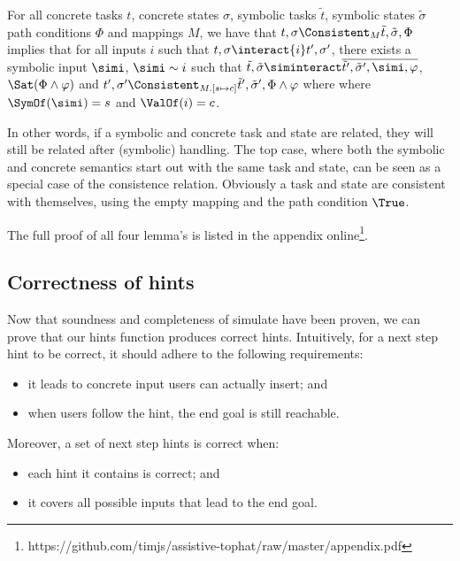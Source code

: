 \begin{lemma}
  \label{lem:completeinteracting}
  For all concrete tasks $t$, concrete states $\sigma$, symbolic tasks $\tilde{t}$, symbolic states $\tilde{\sigma}$ path conditions $\Phi$ and mappings $M$,
  we have that $t,\sigma\Consistent_{M}\tilde{t},\tilde{\sigma},\Phi$ implies
  that for all inputs $i$ such that $t,\sigma\interact{i}t',\sigma'$,
  there exists a symbolic input $\simi$, $\simi\sim i$ such that
  $\tilde{t},\tilde{\sigma}\siminteract\overline{\tilde{t}',\tilde{\sigma}',\simi,\phi}$, $\Sat(\Phi\land\phi)$ and $t',\sigma'\Consistent_{M.[s\mapsto c]}\tilde{t}',\tilde{\sigma}',\Phi\land\phi$ where where $\SymOf(\simi)=s$ and $\ValOf(i)=c$.
\end{lemma}

In other words, if a symbolic and concrete task and state are related, they will still be related after (symbolic) handling.
The top case, where both the symbolic and concrete semantics start out with the same task and state,
can be seen as a special case of the consistence relation.
Obviously a task and state are consistent with themselves, using the empty mapping and the path condition $\True$.

The full proof of all four lemma's is listed in the appendix online\footnote{https://github.com/timjs/assistive-tophat/raw/master/appendix.pdf}.


\subsection{Correctness of hints}

Now that soundness and completeness of simulate have been proven, we can prove that our hints function produces correct hints.
Intuitively, for a next step hint to be correct, it should adhere to the following requirements:
\begin{itemize}
  \item it leads to concrete input users can actually insert; and
  \item when users follow the hint, the end goal is still reachable.
\end{itemize}
Moreover, a set of next step hints is correct when:
\begin{itemize}
  \item each hint it contains is correct; and
  \item it covers all possible inputs that lead to the end goal.
\end{itemize}

